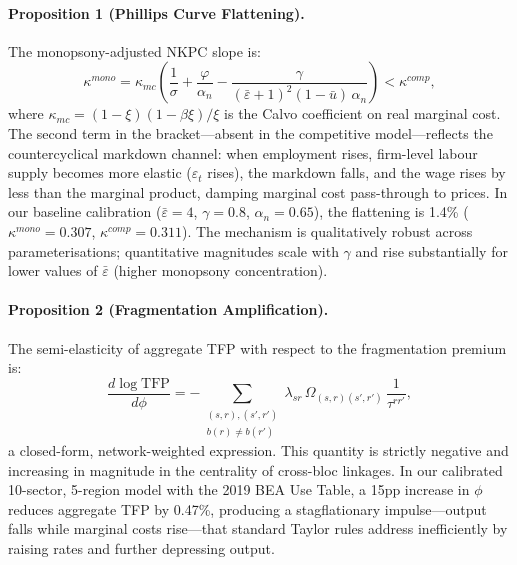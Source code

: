 \paragraph{Proposition 1 (Phillips Curve Flattening).}
The monopsony-adjusted NKPC slope is:
\begin{equation*}
  \kappa^{mono} = \kappa_{mc}\left(\frac{1}{\sigma} + \frac{\varphi}{\alpha_n}
    - \frac{\gamma}{(\bar\varepsilon+1)^2(1-\bar u)\,\alpha_n}\right)
  < \kappa^{comp},
\end{equation*}
where $\kappa_{mc} = (1-\xi)(1-\beta\xi)/\xi$ is the Calvo coefficient on
real marginal cost. The second term in the bracket---absent in the competitive
model---reflects the countercyclical markdown channel: when employment rises,
firm-level labour supply becomes more elastic ($\varepsilon_t$ rises), the
markdown falls, and the wage rises by less than the marginal product, damping
marginal cost pass-through to prices. In our baseline calibration
($\bar\varepsilon = 4$, $\gamma = 0.8$, $\alpha_n = 0.65$), the flattening is
1.4\% ($\kappa^{mono} = 0.307$, $\kappa^{comp} = 0.311$). The mechanism is
qualitatively robust across parameterisations; quantitative magnitudes scale with
$\gamma$ and rise substantially for lower values of $\bar\varepsilon$ (higher
monopsony concentration).

\paragraph{Proposition 2 (Fragmentation Amplification).}
The semi-elasticity of aggregate TFP with respect to the fragmentation premium
is:
\begin{equation*}
  \frac{d\log\mathrm{TFP}}{d\phi} = -\!\!\!\sum_{\substack{(s,r),(s',r')\\b(r)\neq b(r')}}
    \lambda_{sr} \,\Omega_{(s,r)(s',r')} \,\frac{1}{\tau^{rr'}},
\end{equation*}
a closed-form, network-weighted expression. This quantity is strictly negative
and increasing in magnitude in the centrality of cross-bloc linkages. In our
calibrated 10-sector, 5-region model with the 2019 BEA Use Table, a 15pp
increase in $\phi$ reduces aggregate TFP by 0.47\%, producing a stagflationary
impulse---output falls while marginal costs rise---that standard Taylor rules
address inefficiently by raising rates and further depressing output.

